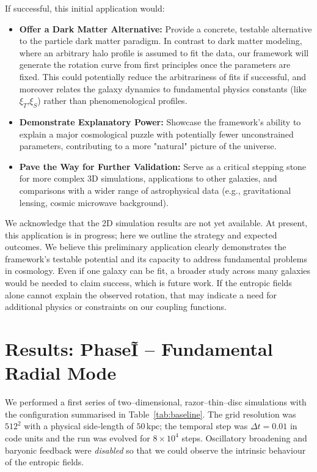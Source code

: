 \documentclass[11pt,a4paper]{article} %
\begin{document}
If successful, this initial application would:
\begin{itemize}
    \item \textbf{Offer a Dark Matter Alternative:} Provide a concrete, testable alternative to the particle dark matter paradigm. In contrast to dark matter modeling, where an arbitrary halo profile is assumed to fit the data, our framework will generate the rotation curve from first principles once the parameters are fixed. This could potentially reduce the arbitrariness of fits if successful, and moreover relates the galaxy dynamics to fundamental physics constants (like $\xi_T$,$\xi_S$) rather than phenomenological profiles.
    \item \textbf{Demonstrate Explanatory Power:} Showcase the framework's ability to explain a major cosmological puzzle with potentially fewer unconstrained parameters, contributing to a more "natural" picture of the universe.
    \item \textbf{Pave the Way for Further Validation:} Serve as a critical stepping stone for more complex 3D simulations, applications to other galaxies, and comparisons with a wider range of astrophysical data (e.g., gravitational lensing, cosmic microwave background).
\end{itemize}
We acknowledge that the 2D simulation results are not yet available. At present, this application is in progress; here we outline the strategy and expected outcomes. We believe this preliminary application clearly demonstrates the framework's testable potential and its capacity to address fundamental problems in cosmology. Even if one galaxy can be fit, a broader study across many galaxies would be needed to claim success, which is future work. If the entropic fields alone cannot explain the observed rotation, that may indicate a need for additional physics or constraints on our coupling functions.

\section{Results: Phase\~I – Fundamental Radial Mode}

We performed a first series of two–dimensional, razor–thin–disc simulations with the configuration summarised in Table~\ref{tab:baseline}. The grid resolution was $512^2$ with a physical side‐length of $50\,\mathrm{kpc}$; the temporal step was $\Delta t = 0.01$ in code units and the run was evolved for $8\times10^{4}$ steps. Oscillatory broadening and baryonic feedback were \emph{disabled} so that we could observe the intrinsic behaviour of the entropic fields.
\end{document}
